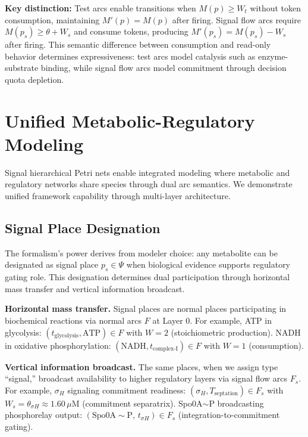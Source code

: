\documentclass[10pt,letterpaper]{article}
\begin{document}
\textbf{Key distinction:} Test arcs enable transitions when $M(p) \geq W_t$ without token consumption, maintaining $M'(p) = M(p)$ after firing. Signal flow arcs require $M(p_s) \geq \theta + W_s$ and consume tokens, producing $M'(p_s) = M(p_s) - W_s$ after firing. This semantic difference between consumption and read-only behavior determines expressiveness: test arcs model catalysis such as enzyme-substrate binding, while signal flow arcs model commitment through decision quota depletion.

\section{Unified Metabolic-Regulatory Modeling}

Signal hierarchical Petri nets enable integrated modeling where metabolic and regulatory networks share species through dual arc semantics. We demonstrate unified framework capability through multi-layer architecture.

\subsection{Signal Place Designation}

The formalism's power derives from modeler choice: any metabolite can be designated as signal place $p_s \in \Psi$ when biological evidence supports regulatory gating role. This designation determines dual participation through horizontal mass transfer and vertical information broadcast.

\vspace{3pt}
\noindent\textbf{Horizontal mass transfer.} Signal places are normal places participating in biochemical reactions via normal arcs $F$ at Layer 0. For example, ATP in glycolysis: $(t_{\text{glycolysis}}, \text{ATP}) \in F$ with $W = 2$ (stoichiometric production). NADH in oxidative phosphorylation: $(\text{NADH}, t_{\text{complex-I}}) \in F$ with $W = 1$ (consumption).

\vspace{3pt}
\noindent\textbf{Vertical information broadcast.} The same places, when we assign type ``signal,'' broadcast availability to higher regulatory layers via signal flow arcs $F_s$. For example, $\sigma_H$ signaling commitment readiness: $(\sigma_H, T_{\text{septation}}) \in F_s$ with $W_s = \theta_{\sigma H} \approx 1.60\,\mu$M (commitment separatrix). Spo0A$\sim$P broadcasting phosphorelay output: $(\text{Spo0A}{\sim}\text{P},\, t_{\sigma H}) \in F_s$ (integration-to-commitment gating).
\end{document}
